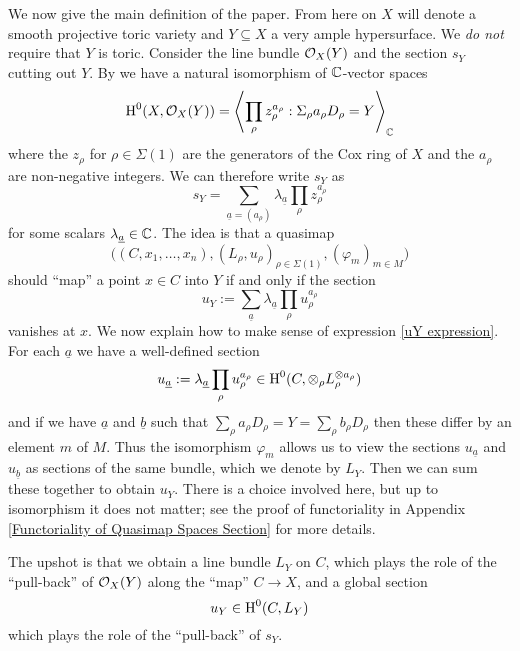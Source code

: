 We now give the main definition of the paper. From here on $X$ will denote a smooth projective toric variety and $Y \subseteq X$ a very ample hypersurface. We \emph{do not} require that $Y$ is toric.
Consider the line bundle $\mathcal{O}_X(Y)$ and the section $s_Y$ cutting out $Y$. By \cite{CoxRing} we have a natural isomorphism of $\mathbb{C}$-vector spaces
\begin{equation*} \operatorname{H}^0(X,\mathcal{O}_X(Y)) = \left\langle \prod_{\rho} z_\rho^{a_\rho} : \Sigma_\rho a_\rho D_\rho = Y \right\rangle_{\mathbb{C}} \end{equation*}
where the $z_\rho$ for $\rho \in \Sigma(1)$ are the generators of the Cox ring of $X$ and the $a_\rho$ are non-negative integers. We can therefore write $s_Y$ as
\begin{equation*} s_Y = \sum_{\underline{a}=(a_\rho)} \lambda_{\underline{a}} \prod_\rho z_\rho^{a_\rho} \end{equation*}
for some scalars $\lambda_{\underline{a}} \in \mathbb{C}$. The idea is that a quasimap
\begin{equation*} \big((C,x_1,\ldots,x_n), (L_\rho,u_\rho)_{\rho \in \Sigma(1)}, (\varphi_m)_{m \in M}\big) \end{equation*}
should ``map'' a point $x \in C$ into $Y$ if and only if the section
\begin{equation} \label{uY expression} u_Y := \sum_{\underline{a}} \lambda_{\underline{a}} \prod_\rho u_\rho^{a_\rho} \end{equation}
vanishes at $x$. We now explain how to make sense of expression \eqref{uY expression}. For each $\underline{a}$ we have a well-defined section
\begin{equation*} u_{\underline{a}} := \lambda_{\underline{a}} \prod_\rho u_\rho^{a_\rho} \in \operatorname{H}^0(C,\otimes_\rho L_\rho^{\otimes a_\rho}) \end{equation*}
and if we have $\underline{a}$ and $\underline{b}$ such that $\sum_\rho a_\rho D_\rho = Y = \sum_\rho b_\rho D_\rho$ then these differ by an element $m$ of $M$. Thus the isomorphism $\varphi_m$ allows us to view the sections $u_{\underline{a}}$ and $u_{\underline{b}}$ as sections of the same bundle, which we denote by $L_Y$. Then we can sum these together to obtain $u_Y$. There is a choice involved here, but up to isomorphism it does not matter; see the proof of functoriality in Appendix \ref{Functoriality of Quasimap Spaces Section} for more details.

The upshot is that we obtain a line bundle $L_Y$ on $C$, which plays the role of the ``pull-back'' of $\mathcal{O}_X(Y)$ along the ``map'' $C \to X$, and a global section
\begin{equation*} u_Y \in \operatorname{H}^0(C,L_Y) \end{equation*}
which plays the role of the ``pull-back'' of $s_Y$.

